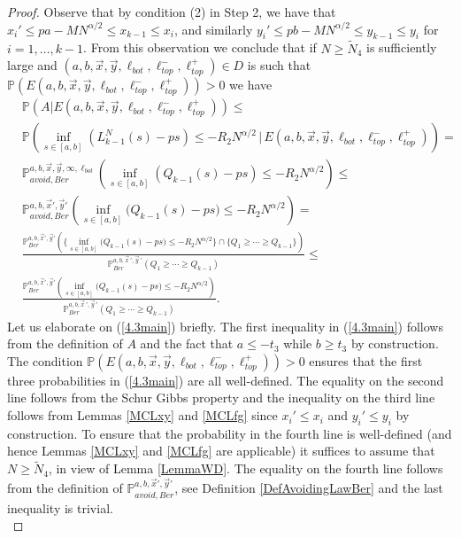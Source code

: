 \begin{proof}
	
	Observe that by condition (2) in Step 2, we have that $x_i'\leq pa - MN^{\alpha/2} \leq x_{k-1} \leq x_i$, and similarly $y_i' \leq pb - MN^{\alpha/2} \leq y_{k-1} \leq y_i$ for $i = 1, \dots, k-1$. From this observation we conclude that if $N \geq \tilde{N}_4$ is sufficiently large and $(a,b,\vec{x},\vec{y},\ell_{bot}, \ell_{top}^-, \ell_{top}^+) \in D$ is such that $\mathbb{P} \left( E(a,b,\vec{x},\vec{y},\ell_{bot}, \ell_{top}^-, \ell_{top}^+) \right) > 0$ we have
	\begin{equation}\label{4.3main}
		\begin{split}
			&\mathbb{P}(A|E(a,b,\vec{x},\vec{y},\ell_{bot},\ell_{top}^-, \ell_{top}^+)) \leq \\
			&\mathbb{P}\left( \inf_{s\in[a, b]} \left(L_{k-1}^N(s) - ps\right) \leq -R_2N^{\alpha/2}\, \big| \, E(a,b,\vec{x},\vec{y},\ell_{bot},\ell_{top}^-, \ell_{top}^+) \right) = \\
			&\mathbb{P}^{a,b, \vec{x}, \vec{y},\infty,\ell_{bot}}_{avoid, Ber} \left( \inf_{s\in[a, b]} \left(Q_{k-1}(s) - ps\right) \leq -R_2N^{\alpha/2} \right) \leq\\
			& \mathbb{P}^{a, b, \vec{x}', \vec{y}'}_{avoid, Ber} \left( \inf_{s\in[a,b]} \big(Q_{k-1}(s) - ps\big) \leq -R_2N^{\alpha/2} \right) = \\
			&\frac{\mathbb{P}^{a, b, \vec{x}', \vec{y}'}_{Ber} \left( \{ \inf_{s\in[a,b]} \big(Q_{k-1}(s) - ps\big) \leq -R_2 N^{\alpha/2} \}  \cap \{ Q_1 \geq \cdots \geq Q_{k-1} \} \right)}{\mathbb{P}^{a, b, \vec{x}\,', \vec{y}\,'}_{Ber}(Q_1 \geq \cdots \geq Q_{k-1})} \leq \\
			&\frac{\mathbb{P}^{a, b, \vec{x}', \vec{y}'}_{Ber} \left( \inf_{s\in[a,b]} \big(Q_{k-1}(s) - ps\big) \leq -R_2 N^{\alpha/2} \right)}{\mathbb{P}^{a, b, \vec{x}\,', \vec{y}\,'}_{Ber}(Q_1 \geq \cdots \geq Q_{k-1})}.
		\end{split}
	\end{equation}
	Let us elaborate on (\ref{4.3main}) briefly. The first inequality in (\ref{4.3main}) follows from the definition of $A$ and the fact that $a \leq -t_3$ while $b \geq t_3$ by construction. The condition $\mathbb{P} \left( E(a,b,\vec{x},\vec{y},\ell_{bot}, \ell_{top}^-, \ell_{top}^+) \right) > 0$ ensures that the first three probabilities in (\ref{4.3main}) are all well-defined. The equality on the second line follows from the Schur Gibbs property and the inequality on the third line follows from Lemmas \ref{MCLxy} and \ref{MCLfg} since $x_i' \leq x_i$ and $y_i' \leq y_i$ by construction. To ensure that the probability in the fourth line is well-defined (and hence Lemmas \ref{MCLxy} and \ref{MCLfg} are applicable) it suffices to assume that $N \geq \tilde{N}_4$, in view of Lemma \ref{LemmaWD}. The equality on the fourth line follows from the definition of $\mathbb{P}^{a, b, \vec{x}', \vec{y}'}_{avoid, Ber} $, see Definition \ref{DefAvoidingLawBer} and the last inequality is trivial.\\
	

\end{proof}
